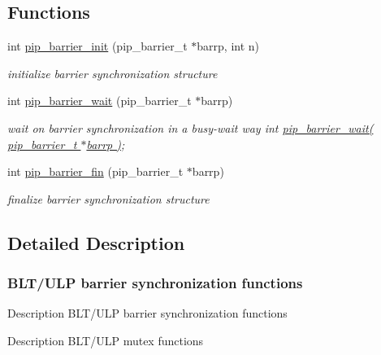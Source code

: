 \documentclass[twoside]{book}
\begin{document}
\subsection*{Functions}
\begin{DoxyCompactItemize}
\item 
int \hyperlink{group__ulp-4-barrier_ga84022f9c64f431e7d513342aeed0b61e}{pip\-\_\-barrier\-\_\-init} (pip\-\_\-barrier\-\_\-t $\ast$barrp, int n)
\begin{DoxyCompactList}\small\item\em initialize barrier synchronization structure \end{DoxyCompactList}\item 
int \hyperlink{group__ulp-4-barrier_gaca103c9732a8e28ee8faf79ef4a69e4f}{pip\-\_\-barrier\-\_\-wait} (pip\-\_\-barrier\-\_\-t $\ast$barrp)
\begin{DoxyCompactList}\small\item\em wait on barrier synchronization in a busy-\/wait way int \hyperlink{group__ulp-4-barrier_gaca103c9732a8e28ee8faf79ef4a69e4f}{pip\-\_\-barrier\-\_\-wait( pip\-\_\-barrier\-\_\-t $\ast$barrp )}; \end{DoxyCompactList}\item 
int \hyperlink{group__ulp-4-barrier_ga70dab15271b84fe05d7088a6cf8bf784}{pip\-\_\-barrier\-\_\-fin} (pip\-\_\-barrier\-\_\-t $\ast$barrp)
\begin{DoxyCompactList}\small\item\em finalize barrier synchronization structure \end{DoxyCompactList}\end{DoxyCompactItemize}


\subsection{Detailed Description}
\hypertarget{ulp-barrier}{}\subsubsection{B\-L\-T/\-U\-L\-P barrier synchronization functions}\label{ulp-barrier}
\begin{DoxyParagraph}{Description}
B\-L\-T/\-U\-L\-P barrier synchronization functions
\end{DoxyParagraph}
\begin{DoxyParagraph}{Description}
B\-L\-T/\-U\-L\-P mutex functions 
\end{DoxyParagraph}
\end{document}
